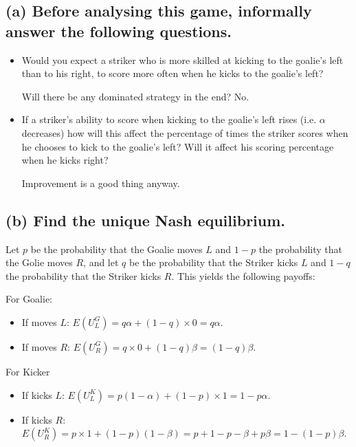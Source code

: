 \documentclass{article}
\begin{document}
\subsection*{(a) Before analysing this game, informally answer the following questions.}

\begin{itemize}
\item Would you expect a striker who is more skilled at kicking to the goalie's left than to his right, to score more often when he kicks to the goalie's left?

\begin{mdframed}[backgroundcolor=blue!20,linecolor=white]
Will there be any dominated strategy in the end? No.
\end{mdframed}


\item If a striker's ability to score when kicking to the goalie's left rises (i.e. $\alpha$ decreases) how will this affect the percentage of times the striker scores when he chooses to kick to the goalie's left? Will it affect his scoring percentage when he kicks right?

\begin{mdframed}[backgroundcolor=blue!20,linecolor=white]
Improvement is a good thing anyway. 
\end{mdframed}

\end{itemize}




\subsection*{(b) Find the unique Nash equilibrium.}

Let $p$ be the probability that the Goalie moves $L$ and $1-p$ the probability that the Golie moves $R$, and let $q$ be the probability that the Striker kicks $L$ and $1-q$ the probability that the Striker kicks $R$. This yields the following payoffs:

\newpage

For Goalie:
\begin{itemize}
\item If moves $L$: $E(U^G_L)= q \alpha + (1-q) \times 0 = q \alpha$.
\item If moves $R$: $E(U^G_R)=q \times 0 + (1-q) \beta =(1-q) \beta$.
\end{itemize}

For Kicker
\begin{itemize}
\item If kicks $L$: $E(U^K_L) = p (1-\alpha) + (1-p)\times 1 = 1 - p\alpha$.
\item If kicks $R$: $E(U^K_R) = p\times 1 + (1-p)(1-\beta) = p + 1 - p - \beta + p\beta = 1 - (1-p)\beta$.
\end{itemize}
\end{document}
